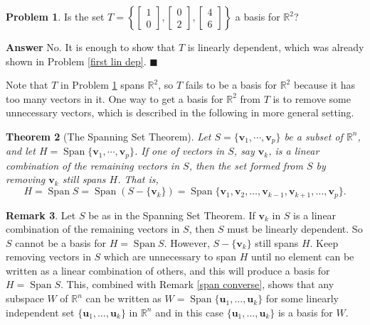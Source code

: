 \documentclass[12pt,letterpaper]{book}
\numberwithin{equation}{section}
\newtheorem{thm}{\textbf{Theorem}}[section]
\theoremstyle{definition}
\newtheorem{problem}[thm]{\textbf{Problem}}
\newtheorem{remark}[thm]{\textbf{Remark}}
\newenvironment{answer}{\noindent\textbf{Answer}}{\hfill$\blacksquare$\vspace{0.1in}}
\newcommand{\vu}{\bm{u}}
\newcommand{\vv}{\bm{v}}
\newcommand{\Span}{\operatorname{Span}}
\begin{document}
\begin{problem}\label{too many} Is the set $T=\left\{\left[\begin{array}{r} 1 \\
0 \end{array}\right],\left[\begin{array}{r} 0 \\ 2
\end{array}\right],\left[\begin{array}{r} 4 \\ 6
\end{array}\right]\right\}$ a basis for $\mathbb{R}^2$?
\end{problem}

\begin{answer}
No. It is enough to show that $T$ is linearly dependent, which was already shown in Problem \ref{first lin dep}.
\end{answer}

Note that $T$ in Problem \ref{too many} spans $\mathbb{R}^2$, so $T$ fails to be a basis for $\mathbb{R}^2$ because it has too many vectors in it. One way to get a basis for $\mathbb{R}^2$ from $T$ is to remove some unnecessary vectors, which is described in the following in more general setting.

\begin{thm}[The Spanning Set Theorem] Let $S=\{\vv_1,\cdots,\vv_p\}$ be
a subset of $\mathbb{R}^n$, and let
$H=\Span\{\vv_1,\cdots,\vv_p\}$. If one of vectors in $S$, say
$\vv_k$, is a linear combination of the remaining vectors in $S$,
then the set formed from $S$ by removing $\vv_k$ still spans $H$.
That is,
$$H=\Span S=\Span(S-\{\vv_k\})=\Span\{\vv_1,\vv_2,\ldots,\vv_{k-1},\vv_{k+1},\ldots,\vv_p\}.$$
\end{thm}

\begin{remark}\label{W as span} Let $S$ be as in the Spanning Set Theorem. If $\vv_k$ in $S$ is a linear combination of the remaining vectors in $S$, then $S$ must be linearly dependent. So
$S$ cannot be a basis for $H=\Span S$. However, $S-\{\vv_k\}$ still spans $H$. Keep removing vectors in $S$
which are unnecessary to span $H$ until no element can be written as a linear combination of others, and this will produce a basis for
$H=\Span S$. This, combined with Remark \ref{span converse}, shows that any subspace $W$ of $\mathbb{R}^n$ can be written as $W=\Span\{\vu_1,\ldots,\vu_k\}$ for some linearly independent set $\{\vu_1,\ldots,\vu_k\}$ in $\mathbb{R}^n$ and in this case $\{\vu_1,\ldots,\vu_k\}$ is a basis for $W$.
\end{remark}
\end{document}
